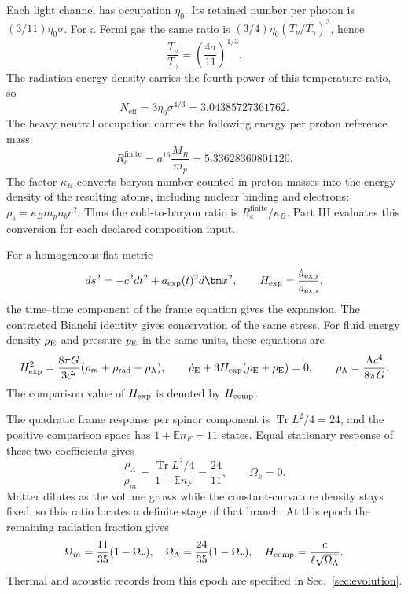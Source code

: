 \documentclass[aps,prx,onecolumn,10pt,notitlepage,nofootinbib,longbibliography]{revtex4-2}
\numberwithin{equation}{section}
\numberwithin{table}{section}
\newcommand{\EE}{\mathbb E}
\newcommand{\Tr}{\operatorname{Tr}}
\newcommand{\MR}{M_R}
\begin{document}
Each light channel has occupation $\eta_0$. Its retained number per photon is $(3/11)\eta_0\sigma$. For a Fermi gas the same ratio is $(3/4)\eta_0(T_\nu/T_\gamma)^3$, hence
\begin{equation}
 \frac{T_\nu}{T_\gamma}=\left(\frac{4\sigma}{11}\right)^{1/3}.
 \label{eq:neutrinotemperatureratio}
\end{equation}
The radiation energy density carries the fourth power of this temperature ratio, so
\begin{equation}
 N_{\mathrm{eff}}=3\eta_0\sigma^{4/3}=3.04385727361762.
\end{equation}
The heavy neutral occupation carries the following energy per proton reference mass:
\begin{equation}
 R_c^{\mathrm{finite}}=a^{16}\frac{\MR}{m_p}=5.33628360801120.
 \label{eq:coldnative}
\end{equation}
The factor $\kappa_B$ converts baryon number counted in proton masses into the energy density of the resulting atoms, including nuclear binding and electrons: $\rho_b=\kappa_Bm_p n_b c^2$. Thus the cold-to-baryon ratio is $R_c^{\mathrm{finite}}/\kappa_B$. Part III evaluates this conversion for each declared composition input.

For a homogeneous flat metric
\begin{equation}
 ds^2=-c^2dt^2+a_{\rm exp}(t)^2d\bm x^2,\qquad
 H_{\rm exp}=\frac{\dot a_{\rm exp}}{a_{\rm exp}},
\end{equation}
the time--time component of the frame equation gives the expansion. The contracted Bianchi identity gives conservation of the same stress. For fluid energy density $\rho_{\rm E}$ and pressure $p_{\rm E}$ in the same units, these equations are
\begin{equation}
 H_{\rm exp}^2=\frac{8\pi G}{3c^2}(\rho_m+\rho_{\rm rad}+\rho_\Lambda),\qquad
 \dot\rho_{\rm E}+3H_{\rm exp}(\rho_{\rm E}+p_{\rm E})=0,\qquad
 \rho_\Lambda=\frac{\Lambda c^4}{8\pi G}.
 \label{eq:friedmann}
\end{equation}
The comparison value of $H_{\rm exp}$ is denoted by $H_{\rm comp}$.

The quadratic frame response per spinor component is $\Tr L^2/4=24$, and the positive comparison space has $1+\EE n_F=11$ states. Equal stationary response of these two coefficients gives
\begin{equation}
 \frac{\rho_\Lambda}{\rho_m}=\frac{\Tr L^2/4}{1+\EE n_F}=\frac{24}{11},\qquad\Omega_k=0.
 \label{eq:epochcount}
\end{equation} Matter dilutes as the volume grows while the constant-curvature density stays fixed, so this ratio locates a definite stage of that branch. At this epoch the remaining radiation fraction gives
\begin{equation}
 \Omega_m=\frac{11}{35}(1-\Omega_r),\quad
 \Omega_\Lambda=\frac{24}{35}(1-\Omega_r),\quad
 H_{\rm comp}=\frac{c}{\ell\sqrt{\Omega_\Lambda}}.
 \label{eq:epoch}
\end{equation}
Thermal and acoustic records from this epoch are specified in Sec.~\ref{sec:evolution}.
\end{document}
